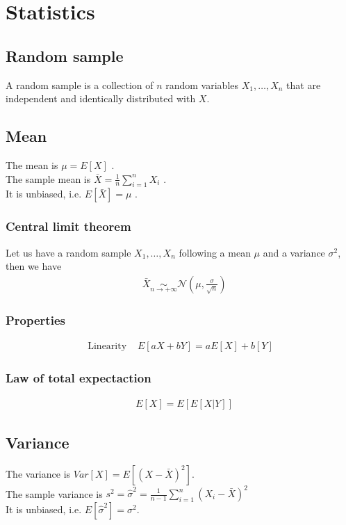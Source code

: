 \documentclass[../main.tex]{subfiles}
\begin{document}
\chapter{Statistics}
\section{Random sample}
A random sample is a collection of $n$ random variables $X_1,\dots, X_n$ that are independent and
identically distributed with $X$.


\section{Mean}
The mean is $\mu = E[X]$ . \\
The sample mean is $\bar{X} = \frac{1}{n} \sum_{i=1}^{n}{X_i}$ . \\
It is unbiased, i.e. $E[\bar{X}] = \mu$ .
\subsection{Central limit theorem}
Let us have a random sample $X_1,\dots, X_n$ following a mean $\mu$ and a variance $\sigma^2$, then we have
\begin{align*}
    &\bar{X} \underset{n \to +\infty}{\sim} \mathcal{N}(\mu, \frac{\sigma}{\sqrt{n}})
\end{align*}

\subsection{Properties}
\begin{align*}
    \text{Linearity }&E[aX + bY] = aE[X] + b[Y]
\end{align*}

\subsection{Law of total expectaction}
\begin{align*}
    &E[X] = E[E[X|Y]]
\end{align*}

\section{Variance}
The variance is $Var[X] = E[(X - \bar{X})^2]$. \\
The sample variance is $s^2 = \hat{\sigma}^2 = \frac{1}{n-1} \sum_{i=1}^{n}{(X_i - \bar{X})^2}$ \\
It is unbiased, i.e. $E[\hat{\sigma}^2] = \sigma^2$.
\end{document}
